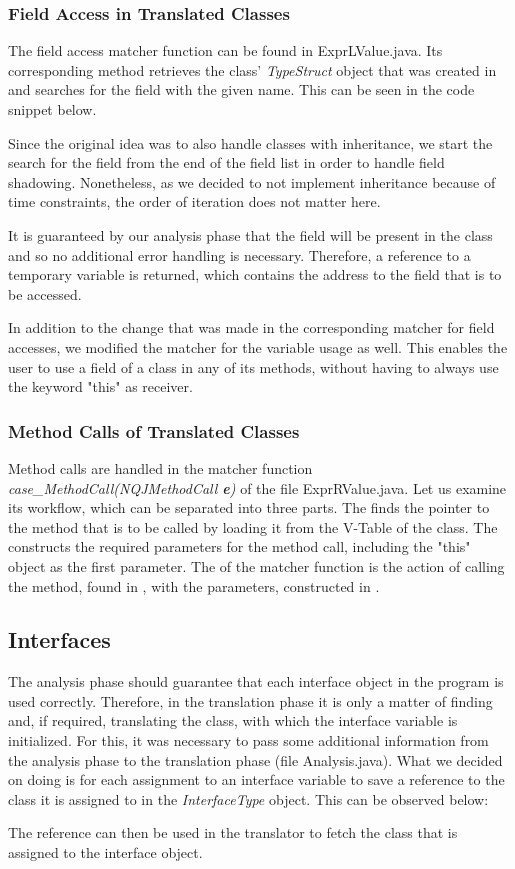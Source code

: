 \subsubsection{Field Access in Translated Classes}
The field access matcher function can be found in ExprLValue.java.
Its corresponding method retrieves the 
class' \textit{TypeStruct} object that was created in 
and searches for the field with the given name.
This can be seen in the code snippet below.

Since the original idea was to also handle classes with inheritance, we start the search
for the field from the end of the field list in order to handle field shadowing.
Nonetheless, as we decided to not implement inheritance because of time constraints,
the order of iteration does not matter here.

It is guaranteed by our analysis phase that the field will be present
in the class and so no additional error handling is necessary.
Therefore, a reference to a temporary variable is returned, which contains the address to the
field that is to be accessed.

In addition to the change that was made in the corresponding matcher for field accesses,
we modified the matcher for the variable usage as well.
This enables the user to use a field of a class in any of its methods, without having
to always use the keyword "this" as receiver.

\subsubsection{Method Calls of Translated Classes}
Method calls are handled in the matcher function \textit{case\_MethodCall(NQJMethodCall \textbf{e})} of the file ExprRValue.java.
Let us examine its workflow, which can be separated into three parts.
The  finds the pointer to the method that is to be called by
loading it from the V-Table of the class.
The  constructs the required parameters for the method call,
including the "this" object as the first parameter.
The  of the matcher function is the action of calling the method,
found in , with the parameters, constructed in .

\subsection{Interfaces}
The analysis phase should guarantee that each interface object in the program
is used correctly. Therefore, in the translation phase
it is only a matter of finding and, if required, translating the class,
with which the interface variable is initialized.
For this, it was necessary to pass some additional
information from the analysis phase to the translation phase (file Analysis.java).
What we decided on doing is for each assignment
to an interface variable to save a reference to the class it is assigned to
in the \textit{InterfaceType} object.
This can be observed below:
 

The reference can then be used in the translator to fetch the class
that is assigned to the interface object.
